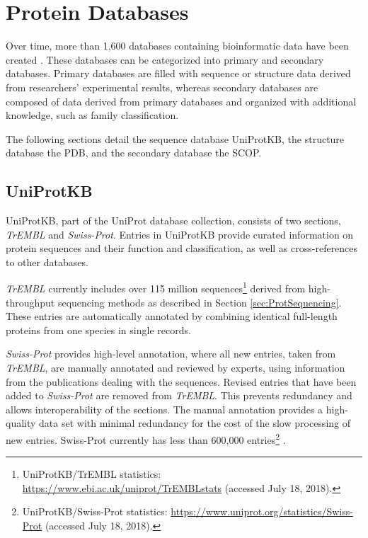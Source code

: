 
\section{Protein Databases}


Over time, more than 1,600 databases containing bioinformatic data have been created \cite{Galperin.2017}. These databases can be categorized into primary and secondary databases. Primary databases are filled with sequence or structure data derived from researchers' experimental results, whereas secondary databases are composed of data derived from primary databases and organized with additional knowledge, such as family classification.    

The following sections detail the sequence database \ac{UniProtKB}, the structure database the \ac{PDB}, and the secondary database the \ac{SCOP}.

\subsection{UniProtKB}
\label{ssec:uniprot}

\ac{UniProtKB}, part of the UniProt database collection, consists of two sections, \textit{TrEMBL} and \textit{Swiss-Prot}. Entries in UniProtKB provide curated information on protein sequences and their function and classification, as well as cross-references to other databases.

\textit{TrEMBL} currently includes over 115 million sequences\footnote{UniProtKB/TrEMBL statistics: \url{https://www.ebi.ac.uk/uniprot/TrEMBLstats} (accessed July 18, 2018).} derived from high-throughput sequencing methods as described in Section \ref{sec:ProtSequencing}. These entries are automatically annotated by combining identical full-length proteins from one species in single records.  

\textit{Swiss-Prot} provides high-level annotation, where all new entries, taken from \textit{TrEMBL}, are manually annotated and reviewed by experts, using information from the publications dealing with the sequences.
Revised entries that have been added to \textit{Swiss-Prot} are removed from \textit{TrEMBL}. This prevents redundancy and allows interoperability of the sections. The manual annotation provides a high-quality data set with minimal redundancy for the cost of the slow processing of new entries. Swiss-Prot currently has less than 600,000 entries\footnote{UniProtKB/Swiss-Prot statistics: \url{https://www.uniprot.org/statistics/Swiss-Prot} (accessed July 18, 2018).} \cite{TheUniProtConsortium.2017}.


